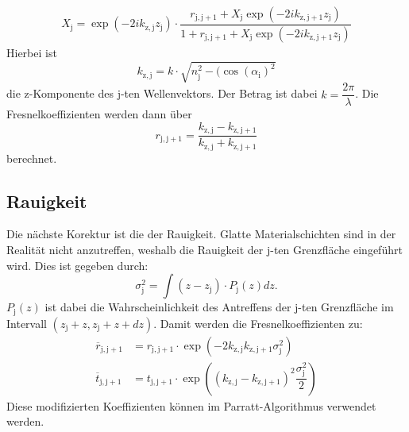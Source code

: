 \begin{align}
  \label{eqn:Parratt-Algorithmus}
X_\mathrm{j}= \exp(-2i k_\mathrm{z,j}z_\mathrm{j})\cdot\dfrac{r_\mathrm{j,j+1}+X_\mathrm{j}\exp(-2i k_\mathrm{z,j+1}z_\mathrm{j})}{1+r_\mathrm{j,j+1}+X_\mathrm{j}\exp(-2i k_\mathrm{z,j+1}z_\mathrm{j})}
\end{align}
Hierbei ist
\begin{equation}
  \label{eqn:kzj}
 k_\mathrm{z,j}= k\cdot\sqrt{n_\mathrm{j}^2-(\cos(\alpha_\mathrm{i})^2}
\end{equation}
die z-Komponente des j-ten Wellenvektors. Der Betrag ist dabei $k=\dfrac{2\pi}{\lambda}$. Die Fresnelkoeffizienten werden dann über
\begin{equation}
  \label{eqn:Veränderten Fresnelkoefizienten}
  r_\mathrm{j,j+1}= \dfrac{k_\mathrm{z,j}-k_\mathrm{z,j+1}}{ k_\mathrm{z,j}+ k_\mathrm{z,j+1}}
\end{equation}
berechnet.
\subsection{Rauigkeit}
\label{sec:Rauigkeit}
Die nächste Korektur ist die der Rauigkeit. Glatte Materialschichten sind in der Realität nicht anzutreffen, weshalb die Rauigkeit der j-ten Grenzfläche eingeführt wird. Dies ist gegeben durch:
\begin{equation}
  \label{eqn:rms}
\sigma_\mathrm{j}^2= \int (z-z_\mathrm{j})\cdot P_\mathrm{j}(z) dz.
\end{equation}
$P_\mathrm{j}(z)$ ist dabei die Wahrscheinlichkeit des Antreffens der j-ten Grenzfläche im Intervall $(z_\mathrm{j}+z,z_\mathrm{j}+z+dz)$.
Damit werden die Fresnelkoeffizienten zu:
\begin{align}
  \label{eqn:modkoeff}
  \overline{r}_\mathrm{j,j+1}&=r_\mathrm{j,j+1}\cdot\exp(-2 k_\mathrm{z,j} k_\mathrm{z,j+1}\sigma_\mathrm{j}^2) \\
  \label{eqn:modkoeff2}
  \overline{t}_\mathrm{j,j+1}&=t_\mathrm{j,j+1}\cdot\exp\left(( k_\mathrm{z,j}-k_\mathrm{z,j+1})^2 \dfrac{\sigma_\mathrm{j}^2}{2}\right)
\end{align}
Diese modifizierten Koeffizienten können im Parratt-Algorithmus verwendet werden.
